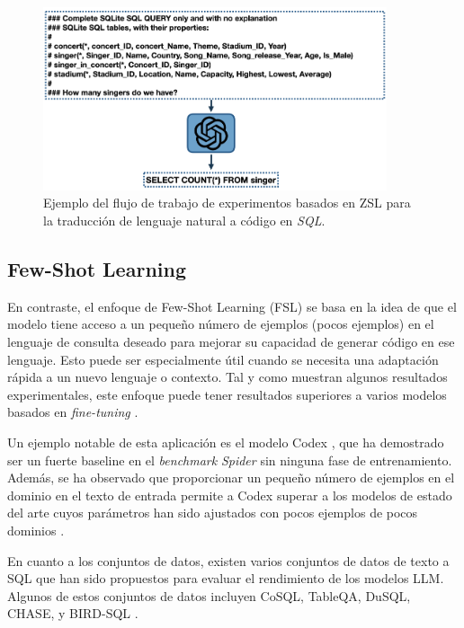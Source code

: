 \begin{figure}[H]\label{zslpromtpsql}
	\centering
	\includegraphics[width = 0.9\textwidth]{./Graphics/zslpromptsql}
	\caption{Ejemplo del flujo de trabajo de experimentos basados en ZSL para la traducción de lenguaje natural a código en \textit{SQL}.}
\end{figure} 

\subsection{Few-Shot Learning} \label{llm_approach_fsl}
	En contraste, el enfoque de Few-Shot Learning (FSL) \cite{fewshotlearning} se basa en la idea de que el modelo tiene acceso a un pequeño número de ejemplos (pocos ejemplos) en el lenguaje de consulta deseado para mejorar su capacidad de generar código en ese lenguaje. Esto puede ser especialmente útil cuando se necesita una adaptación rápida a un nuevo lenguaje o contexto. Tal y como muestran algunos resultados experimentales, este enfoque puede tener resultados superiores a varios modelos basados en \textit{fine-tuning} \cite{ftvsllmtext2sql}.

Un ejemplo notable de esta aplicación es el modelo Codex \cite{codex}, que ha demostrado ser un fuerte baseline en el \textit{benchmark} \textit{Spider} \cite{spiderdataset} sin ninguna fase de entrenamiento. Además, se ha observado que proporcionar un pequeño número de ejemplos en el dominio en el texto de entrada permite a Codex superar a los modelos de estado del arte cuyos parámetros han sido ajustados con pocos ejemplos de pocos dominios \cite{codex}.

En cuanto a los conjuntos de datos, existen varios conjuntos de datos de texto a SQL que han sido propuestos para evaluar el rendimiento de los modelos LLM. Algunos de estos conjuntos de datos incluyen CoSQL, TableQA, DuSQL, CHASE, y BIRD-SQL \cite{CoSQL} \cite{TableQA} \cite{DuSQL} \cite{CHASE} \cite{BIRD-SQL}.


